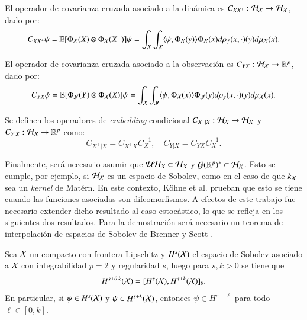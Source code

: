 \begin{defn}
    El operador de covarianza cruzada asociado a la dinámica es $C_{X X^+} : \mathcal{H}_{\mathcal{X}} \to \mathcal{H}_{\mathcal{X}}$, dado por:
	\begin{equation*}
		C_{X X^+} \psi = \mathbb{E}[\Phi_{\mathcal{X}} (X) \otimes \Phi_{\mathcal{X}} (X^+)] \psi = \int_{\mathcal{X}} \int_{\mathcal{X}} \langle \psi, \Phi_{\mathcal{X}} (y) \rangle \Phi_{\mathcal{X}} (x) d\rho_f (x, \cdot)(y) d \mu_{\mathcal{X}} (x).
	\end{equation*}
    
    El operador de covarianza cruzada asociado a la observación es $C_{YX} : \mathcal{H}_{\mathcal{X}} \to \mathbb{R}^p$, dado por:
	\begin{equation*}
		C_{Y X} \psi = \mathbb{E}[\Phi_{\mathcal{Y}} (Y) \otimes \Phi_{\mathcal{X}} (X)] \psi = \int_{\mathcal{X}} \int_{\mathcal{Y}} \langle \psi, \Phi_{\mathcal{X}} (x) \rangle \Phi_{\mathcal{Y}} (y) d\rho_g (x, \cdot)(y) d \mu_{\mathcal{X}} (x).
	\end{equation*}
\end{defn}

\begin{defn}   
    Se definen los operadores de \textit{embedding} condicional $C_{X^+ | X} : \mathcal{H}_{\mathcal{X}} \to \mathcal{H}_{\mathcal{X}}$ y $C_{Y | X} : \mathcal{H}_{\mathcal{X}} \to \mathbb{R}^p$ como:
	\begin{equation*}
		C_{X^+ | X} = C_{X^+ X} C_X^{-1}, \quad C_{Y | X} = C_{Y X} C_X^{-1}.
	\end{equation*}
\end{defn}

Finalmente, será necesario asumir que $\mathcal{U} \mathcal{H}_{\mathcal{X}} \subset \mathcal{H}_{\mathcal{X}}$ y $\mathcal{G} (\mathbb{R}^p)^* \subset \mathcal{H}_{\mathcal{X}}$. Esto se cumple, por ejemplo, si $\mathcal{H}_{\mathcal{X}}$ es un espacio de Sobolev, como en el caso de que $k_{\mathcal{X}}$ sea un \textit{kernel} de Matérn. En este contexto, Köhne et al. \cite{Kohne2024L-errorDecomposition} prueban que esto se tiene cuando las funciones asociadas son difeomorfismos. A efectos de este trabajo fue necesario extender dicho resultado al caso estocástico, lo que se refleja en los siguientes dos resultados. Para la demostración será necesario un teorema de interpolación de espacios de Sobolev de Brenner y Scott \cite{Brenner2008TheMethods}.

\begin{lema}
    \label{lema:interpolacion}
    Sea $\mathcal{X}$ un compacto con frontera Lipschitz y $H^s(\mathcal{X})$ el espacio de Sobolev asociado a $\mathcal{X}$ con integrabilidad $p=2$ y regularidad $s$, luego para $s, k > 0$ se tiene que
    \[
        H^{s+\theta \cdot k} (\mathcal{X}) = [H^s (\mathcal{X}), H^{s+k} (\mathcal{X})]_\theta.
    \]
    En particular, si $\psi \in H^{s}(\mathcal{X})$ y $\psi \in H^{s+k}(\mathcal{X})$, entonces $\psi \in H^{s+\ell}$ para todo $\ell \in [0, k]$.
\end{lema}

